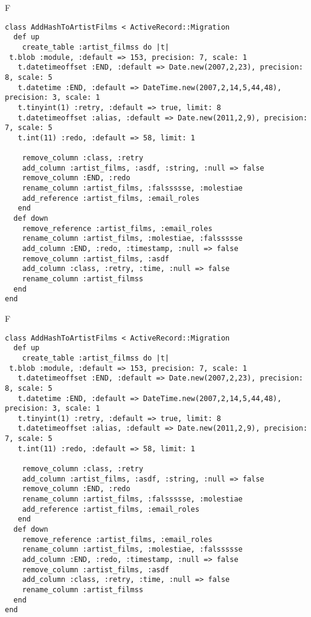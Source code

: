F
\begin{verbatim}
class AddHashToArtistFilms < ActiveRecord::Migration
  def up
    create_table :artist_filmss do |t| 
 t.blob :module, :default => 153, precision: 7, scale: 1
   t.datetimeoffset :END, :default => Date.new(2007,2,23), precision: 8, scale: 5
   t.datetime :END, :default => DateTime.new(2007,2,14,5,44,48), precision: 3, scale: 1
   t.tinyint(1) :retry, :default => true, limit: 8
   t.datetimeoffset :alias, :default => Date.new(2011,2,9), precision: 7, scale: 5
   t.int(11) :redo, :default => 58, limit: 1

    remove_column :class, :retry
    add_column :artist_films, :asdf, :string, :null => false
    remove_column :END, :redo
    rename_column :artist_films, :falssssse, :molestiae
    add_reference :artist_films, :email_roles
   end
  def down
    remove_reference :artist_films, :email_roles
    rename_column :artist_films, :molestiae, :falssssse
    add_column :END, :redo, :timestamp, :null => false
    remove_column :artist_films, :asdf
    add_column :class, :retry, :time, :null => false
    rename_column :artist_filmss
  end
end
\end{verbatim}

F
\begin{verbatim}
class AddHashToArtistFilms < ActiveRecord::Migration
  def up
    create_table :artist_filmss do |t| 
 t.blob :module, :default => 153, precision: 7, scale: 1
   t.datetimeoffset :END, :default => Date.new(2007,2,23), precision: 8, scale: 5
   t.datetime :END, :default => DateTime.new(2007,2,14,5,44,48), precision: 3, scale: 1
   t.tinyint(1) :retry, :default => true, limit: 8
   t.datetimeoffset :alias, :default => Date.new(2011,2,9), precision: 7, scale: 5
   t.int(11) :redo, :default => 58, limit: 1

    remove_column :class, :retry
    add_column :artist_films, :asdf, :string, :null => false
    remove_column :END, :redo
    rename_column :artist_films, :falssssse, :molestiae
    add_reference :artist_films, :email_roles
   end
  def down
    remove_reference :artist_films, :email_roles
    rename_column :artist_films, :molestiae, :falssssse
    add_column :END, :redo, :timestamp, :null => false
    remove_column :artist_films, :asdf
    add_column :class, :retry, :time, :null => false
    rename_column :artist_filmss
  end
end
\end{verbatim}

